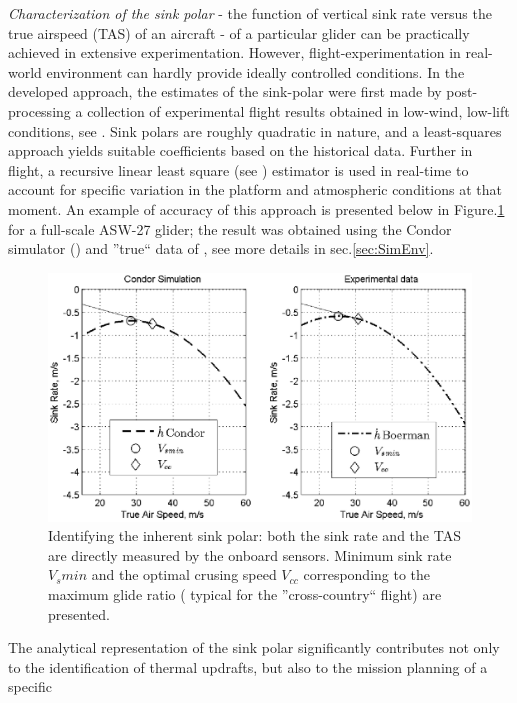 \documentclass{ifacconf}
\begin{document}
\emph{Characterization of the sink polar} - the function of vertical sink rate versus the
true airspeed (TAS) of an aircraft - of a particular glider can be practically achieved
in extensive experimentation. However, flight-experimentation in real-world environment
can hardly provide ideally controlled conditions. In the developed approach, the
estimates of the sink-polar were first made by post-processing a collection of
experimental flight results obtained in low-wind, low-lift conditions, see
\cite{AKlass_JGCD:2012}. Sink polars are roughly quadratic in nature, and a least-squares
approach yields suitable coefficients based on the historical data. Further in flight, a
recursive linear least square (see \cite{Astrom:1995}) estimator is used in real-time to
account for specific variation in the platform and atmospheric conditions at that moment.
An example of accuracy of this approach is presented below in Figure.\ref{fig:SinkPolar}
for a full-scale ASW-27 glider; the result was obtained using the Condor simulator
(\cite{Condor:2013:Online}) and ''true`` data of \cite{Boermans:1994}, see more details
in sec.\ref{sec:SimEnv}.
\begin{figure}[thpb]
  \centering
  \includegraphics[scale=0.52]{Figures/Condor_Boermans_comparison.eps}
  \caption{Identifying the inherent sink polar: both the sink rate and the TAS are directly measured
  by the onboard sensors. Minimum sink rate $V_s min$ and the optimal crusing speed $V_{cc}$
  corresponding to the maximum glide ratio ( typical for the ''cross-country`` flight) are
  presented.}
  \label{fig:SinkPolar}
\end{figure}
The analytical representation of the sink polar significantly contributes not only to the
identification of thermal updrafts, but also to the mission planning of a specific
\end{document}
